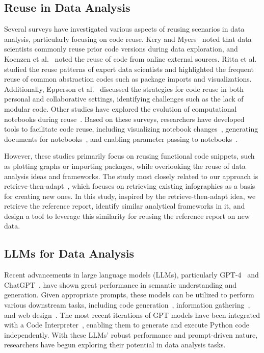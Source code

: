 \subsection{Reuse in Data Analysis}
Several surveys have investigated various aspects of reusing scenarios in data analysis, particularly focusing on code reuse. 
Kery and Myers~\cite{kery2017exploring} noted that data scientists commonly reuse prior code versions during data exploration, and Koenzen et al.~\cite{koenzen2020code} noted the reuse of code from online external sources. 
Ritta et al.~\cite{ritta2022reusingMyOwnCode} studied the reuse patterns of expert data scientists and highlighted the frequent reuse of common abstraction codes such as package imports and visualizations. 
Additionally, Epperson et al.~\cite{epperson2022strategiesReuseTeam} discussed the strategies for code reuse in both personal and collaborative settings, identifying challenges such as the lack of modular code.
Other studies have explored the evolution of computational notebooks during reuse~\cite{liu2023refactoring, raghunandan2023codeEvolution}. 
Based on these surveys, researchers have developed tools to facilitate code reuse, including visualizing notebook changes~\cite{eckelt2024loops}, generating documents for notebooks~\cite{wang2022documentation}, and enabling parameter passing to notebooks~\cite{papermill}. 

However, these studies primarily focus on reusing functional code snippets, such as plotting graphs or importing packages, while overlooking the reuse of data analysis ideas and frameworks.
The study most closely related to our approach is retrieve-then-adapt~\cite{qian2020retrieve}, which focuses on retrieving existing infographics as a basis for creating new ones.
In this study, inspired by the retrieve-then-adapt idea, we retrieve the reference report, identify similar analytical frameworks in it, and design a tool to leverage this similarity for reusing the reference report on new data.


\subsection{LLMs for Data Analysis}

Recent advancements in large language models (LLMs), particularly GPT-4~\cite{openai2023gpt4} and ChatGPT~\cite{chatgpt}, have shown great performance in semantic understanding and generation. 
Given appropriate prompts, these models can be utilized to perform various downstream tasks, including code generation~\cite{wang2023dataFormulator}, information gathering~\cite{suh2023Sensecape}, and web design~\cite{kim2022stylette}.
The most recent iterations of GPT models have been integrated with a Code Interpreter~\cite{codeinterpreter}, enabling them to generate and execute Python code independently. 
With these LLMs' robust performance and prompt-driven nature, researchers have begun exploring their potential in data analysis tasks. 

